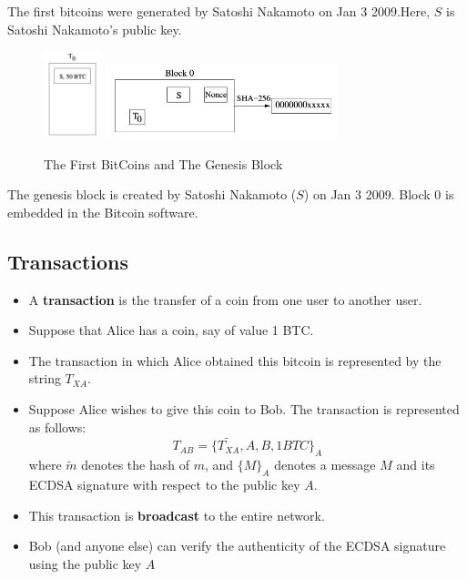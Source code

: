 \documentclass[12pt,titlepage]{article}
\begin{document}
The first bitcoins were generated by Satoshi Nakamoto on Jan 3 2009.Here, $S$ is Satoshi Nakamoto’s public key.
\begin{center}
	\begin{figure}[h!]
		\centering
		\includegraphics[width=0.15\textwidth]{The_First_BitCoins.png}
		\includegraphics[width=0.6\textwidth]{The_Genesis_Block.png}
	\caption{The First BitCoins and The Genesis Block}
	\end{figure}
\end{center}
The genesis block is created by Satoshi Nakamoto ($S$) on Jan 3 2009. Block 0 is embedded in the Bitcoin software.

\subsection{Transactions}
\begin{itemize}
	\item A \textbf{transaction} is the transfer of a coin from one user to another user.
	\item Suppose that Alice has a coin, say of value 1 BTC.
	\item The transaction in which Alice obtained this bitcoin is represented by the string $T_{XA}$.
	\item Suppose Alice wishes to give this coin to Bob. The transaction is represented as follows: $$T_{AB} = \{\widetilde{T_{XA}}, A, B, 1 BTC\}_A$$ where $\widetilde{m}$ denotes the hash of $m$, and $\{M\}_A$ denotes a message $M$ and its ECDSA signature with respect to the public key $A$.
	\item This transaction is \textbf{broadcast} to the entire network.
	\item Bob (and anyone else) can verify the authenticity of the ECDSA signature using the public key $A$
\end{itemize}
\end{document}
